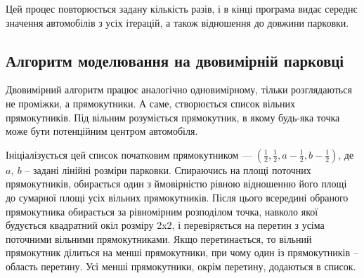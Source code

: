 Цей процес повторюється задану кількість разів, і в кінці програма видає середнє значення автомобілів з усіх ітерацій, а також відношення до довжини парковки.

\subsection{Алгоритм моделювання на двовимірній парковці}

Двовимірний алгоритм працює аналогічно одновимірному, тільки розглядаються не проміжки, а прямокутники. А саме, створюється список вільних прямокутників. Під вільним розуміється прямокутник, в якому будь-яка точка може бути потенційним центром автомобіля.

Ініціалізується цей список початковим прямокутником --- ${(\frac{1}{2}, \frac{1}{2}, a - \frac{1}{2}, b - \frac{1}{2})}$, де $a,~b$ -- задані лінійні розміри парковки. Спираючись на площі поточних прямокутників, обирається один з ймовірністю рівною відношенню його площі до сумарної площі усіх вільних прямокутників. Після цього всередині обраного прямокутника обирається за рівномірним розподілом точка, навколо якої будується квадратний окіл розміру 2x2, і перевіряється на перетин з усіма поточними вільними прямокутниками. Якщо перетинається, то вільний прямокутник ділиться на менші прямокутники, при чому один із прямокутників – область перетину. Усі менші прямокутники, окрім перетину, додаються в список.
